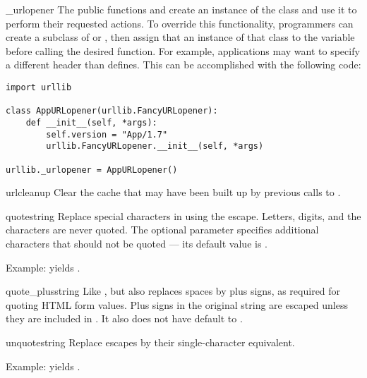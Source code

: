 \begin{datadesc}{_urlopener}
The public functions  and
 create an instance of the
 class and use it to perform their requested
actions.  To override this functionality, programmers can create a
subclass of  or , then assign
that an instance of that class to the
 variable before calling the desired function.
For example, applications may want to specify a different
 header than  defines.  This
can be accomplished with the following code:

\begin{verbatim}
import urllib

class AppURLopener(urllib.FancyURLopener):
    def __init__(self, *args):
        self.version = "App/1.7"
        urllib.FancyURLopener.__init__(self, *args)

urllib._urlopener = AppURLopener()
\end{verbatim}
\end{datadesc}

\begin{funcdesc}{urlcleanup}{}
Clear the cache that may have been built up by previous calls to
.
\end{funcdesc}

\begin{funcdesc}{quote}{string}
Replace special characters in  using the  escape.
Letters, digits, and the characters  are never quoted.
The optional  parameter specifies additional characters
that should not be quoted --- its default value is .

Example:  yields .
\end{funcdesc}

\begin{funcdesc}{quote_plus}{string}
Like , but also replaces spaces by plus signs, as
required for quoting HTML form values.  Plus signs in the original
string are escaped unless they are included in .  It also
does not have  default to .
\end{funcdesc}

\begin{funcdesc}{unquote}{string}
Replace  escapes by their single-character equivalent.

Example:  yields .
\end{funcdesc}

